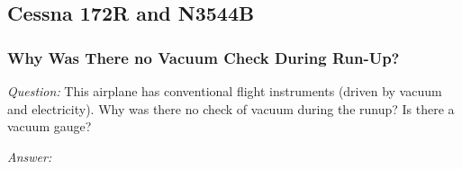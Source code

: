 \documentclass[letterpaper,10pt,titlepage]{article}
\begin{document}

\subsection{Cessna 172R and N3544B}
\label{sqsa0:sc7r0}


\subsubsection{Why Was There no Vacuum Check During Run-Up?}
\label{sqsa0:sc7r0:slhy0}

\emph{Question:} This airplane has conventional flight instruments (driven by
vacuum and electricity).  Why was there no check of vacuum during the runup?  Is
there a vacuum gauge?

\noindent{}\emph{Answer:}


%
%
\clearpage
{}
\printindex
\end{document}
